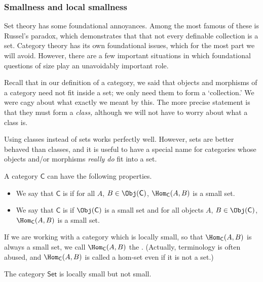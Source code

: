 \documentclass[notes.tex]{subfiles}
\begin{document}
\subsubsection{Smallness and local smallness}

Set theory has some foundational annoyances. Among the most famous of these is Russel's paradox, which demonstrates that that not every definable collection is a set. Category theory has its own foundational issues, which for the most part we will avoid. However, there are a few important situations in which foundational questions of size play an unavoidably important role.

Recall that in our definition of a category, we said that objects and morphisms of a category need not fit inside a set; we only need them to form a `collection.' We were cagy about what exactly we meant by this. The more precise statement is that they must form a \emph{class,} although we will not have to worry about what a class is.

Using classes instead of sets works perfectly well. However, sets are better behaved than classes, and it is useful to have a special name for categories whose objects and/or morphisms \emph{really do} fit into a set.

\begin{definition}
  \label{def:smalllocallysmallcategoryhomset}
  A category $\mathsf{C}$ can have the following properties.
  \begin{itemize}
    \item We say that $\mathsf{C}$ is  if for all $A$, $B \in \Obj(\mathsf{C})$, $\Hom_{\mathsf{C}}(A, B)$ is a small set.

    \item We say that $\mathsf{C}$ is  if $\Obj(\mathsf{C})$ is a small set and for all objects $A$, $B \in \Obj(\mathsf{C})$, $\Hom_{\mathsf{C}}(A, B)$ is a small set.
  \end{itemize}
\end{definition}

If we are working with a category which is locally small, so that $\Hom_{\mathsf{C}}(A,B)$ is always a small set, we call $\Hom_{\mathsf{C}}(A, B)$ the . (Actually, terminology is often abused, and $\Hom_{\mathsf{C}}(A, B)$ is called a hom-set even if it is not a set.)

\begin{example}
  The category $\mathsf{Set}$ is locally small but not small.
\end{example}
\end{document}
